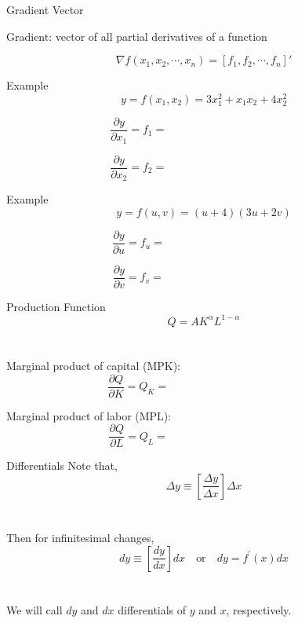 \documentclass{./../../Latex/teaching_slides}
\begin{document}
\begin{frame}{Gradient Vector}

Gradient: vector of all partial derivatives of a function

$$ \nabla f(x_1, x_2, \cdots, x_n) = [f_1, f_2, \cdots, f_n]' $$
\end{frame}

\begin{frame}{Example}
	$$y=f\left(x_{1}, x_{2}\right)=3 x_{1}^{2}+x_{1} x_{2}+4 x_{2}^{2}$$
	
	$$\frac{\partial y}{ \partial x_{1}} = f_1 =  \hspace{5cm} $$
	
	$$\frac{\partial y}{ \partial x_{2}} = f_2 =  \hspace{5cm} $$

\end{frame}

\begin{frame}{Example}
	$$y=f(u, v)=(u+4)(3 u+2 v)$$
	
	$$\frac{\partial y}{ \partial u} = f_u =  \hspace{5cm} $$
	
	$$\frac{\partial y}{ \partial v} = f_v =  \hspace{5cm} $$

\end{frame}

\begin{frame}{Production Function}
$$ Q = A K^{\alpha} L^{1-\alpha} $$ \\~\\

Marginal product of capital (MPK):
	$$\frac{\partial Q}{ \partial K} = Q_K =  \hspace{5cm} $$

Marginal product of labor (MPL):
	$$\frac{\partial Q}{ \partial L} = Q_L =  \hspace{5cm} $$
\end{frame}

\begin{frame}{Differentials}
Note that, 
$$
\Delta y \equiv\left[\frac{\Delta y}{\Delta x}\right] \Delta x
$$ \\~\\

Then for infinitesimal changes,
$$
d y \equiv\left[\frac{d y}{d x}\right] d x \quad \text {or} \quad d y=f^{\prime}(x) d x
$$ \\~\\

We will call $d y$ and $dx$ differentials of $y$ and $x$, respectively.
\end{frame}
\end{document}
